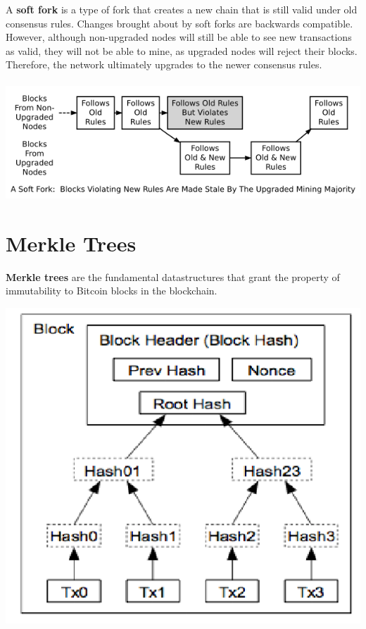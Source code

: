 \documentclass[11pt]{article}
\begin{document}
   
   
   A \textbf{soft fork} is a type of fork that creates a new chain that is still valid under old consensus rules. Changes brought about by soft forks are backwards compatible. However, although non-upgraded nodes will still be able to see new transactions as valid, they will not be able to mine, as upgraded nodes will reject their blocks. Therefore, the network ultimately upgrades to the newer consensus rules. \\ \\
   
  \includegraphics[scale=0.9]{soft_fork} \\
  
  
  \section*{Merkle Trees}
  
   \textbf{Merkle trees} are the fundamental datastructures that grant the property of immutability to Bitcoin blocks in the blockchain. 
   
   \includegraphics[scale=0.6]{merkle} \\
   
\end{document}
